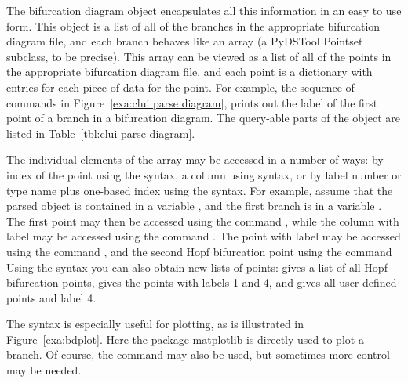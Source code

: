 \documentclass[12pt]{report}
\begin{document}
 The bifurcation diagram object encapsulates all this information in
 an easy to use form.
 This object is a list of all of the branches in the appropriate
 bifurcation diagram file, and each branch behaves like an array
 (a PyDSTool Pointset subclass, to be precise). This array can be
 viewed as a list of all of the points in the appropriate
 bifurcation diagram file, and each point is a \python
 dictionary with entries for each piece of data for the point.
 For example, the sequence of commands
 in Figure~\ref{exa:clui parse diagram}, prints out the
 label of the first point of a branch in a bifurcation diagram.
 The query-able parts of the object are listed in
 Table~\ref{tbl:clui parse diagram}.

 The individual elements of the array may be accessed 
 in a number of ways: by index of the point using the
 \commandf{[]} syntax, a column using \commandf{['columnname']} syntax,
 or by label number or type name plus one-based index using the
 \commandf{()} syntax.  For example, assume that the parsed object is contained
 in a variable , and the first branch is in a variable
 .
 The first point may then be accessed 
 using the command , while the column
 with label  may be accessed using the command
 .
 The point with label  may be accessed using the command
 , and the second Hopf bifurcation point using
 the command 
 Using the \commandf{()} syntax you can also obtain new lists of
 points:  gives a list of all Hopf bifurcation
 points,  gives the points with labels 1 and 4,
 and  gives all user defined points and label
 4.
 
 The \commandf{['columnname']} syntax is especially useful for
 plotting, as is illustrated in Figure~\ref{exa:bdplot}. Here the
 \python package matplotlib is directly used to plot a branch.
 Of course, the command  may also be used, but
 sometimes more control may be needed.
\end{document}
